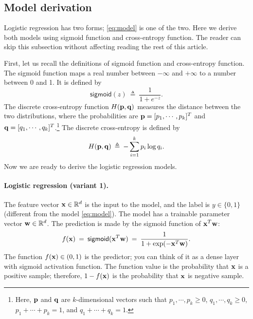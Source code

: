 \documentclass[11pt]{article}
\numberwithin{equation}{section}
\def\pp{{\bf p}}
\def\q{{\bf q}}
\def\w{{\bf w}}
\def\x{{\bf x}}
\def\RB{{\mathbb R}}
\def\sigmoid{\mathsf{sigmoid}}
\begin{document}
\subsection{Model derivation}


Logistic regression has two forms; \eqref{eq:model} is one of the two.
Here we derive both models using sigmoid function and cross-entropy function.
The reader can skip this subsection without affecting reading the rest of this article.


First, let us recall the definitions of sigmoid function and cross-entropy function.
The sigmoid function maps a real number between $-\infty$ and $+\infty$ to a number between 0 and 1.
It is defined by 
\begin{equation*}
\sigmoid (z) 
\: \triangleq \: \frac{1}{ 1 + e^{-z} } .
\end{equation*}
The discrete cross-entropy function $H (\pp , \q )$ measures the distance between the two distributions, 
where the probabilities are $\pp = [p_1, \cdots , p_k]^T$ and $\q= [q_1, \cdots , q_k]^T$.\footnote{Here, $\pp$ and $\q$ are $k$-dimensional vectors such that $p_1 , \cdots , p_k \geq 0$, $q_1 , \cdots , q_k \geq 0$, $p_1 + \cdots + p_k =1$, and $q_1 + \cdots + q_k =1$.}
The discrete cross-entropy is defined by
\begin{equation*}
H (\pp, \q ) 
\: \triangleq \: - \sum_{i=1}^k p_i \log q_i .
\end{equation*}
Now we are ready to derive the logistic regression models.



\paragraph{Logistic regression (variant 1).}
The feature vector $\x \in \RB^d$ is the input to the model,
and the label is $y \in \{0, 1\}$ (different from the model \eqref{eq:model}).
The model has a trainable parameter vector $\w \in \RB^d$.
The prediction is made by the sigmoid function of $\x^T \w$:
\begin{equation*}
f (\x)
\: = \:
\sigmoid ( \x^T \w ) 
\: = \: \frac{1}{ 1 + \exp (-\x^T \w ) } .
\end{equation*}
The function $f( \x) \in (0, 1)$ is the predictor;
you can think of it as a dense layer with sigmoid activation function.
The function value is the probability that $\x$ is a positive sample;
therefore, $1 - f(\x)$ is the probability that $\x$ is negative sample.
\end{document}
